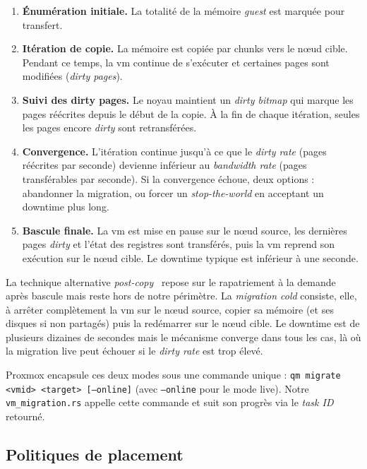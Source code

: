 \begin{enumerate}[leftmargin=*]
    \item \textbf{Énumération initiale.} La totalité de la mémoire \emph{guest} est marquée pour transfert.
    \item \textbf{Itération de copie.} La mémoire est copiée par chunks vers le nœud cible. Pendant ce temps, la \acrshort{vm} continue de s'exécuter et certaines pages sont modifiées (\emph{dirty pages}).
    \item \textbf{Suivi des dirty pages.} Le noyau maintient un \emph{dirty bitmap} qui marque les pages réécrites depuis le début de la copie. À la fin de chaque itération, seules les pages encore \emph{dirty} sont retransférées.
    \item \textbf{Convergence.} L'itération continue jusqu'à ce que le \emph{dirty rate} (pages réécrites par seconde) devienne inférieur au \emph{bandwidth rate} (pages transférables par seconde). Si la convergence échoue, deux options : abandonner la migration, ou forcer un \emph{stop-the-world} en acceptant un downtime plus long.
    \item \textbf{Bascule finale.} La \acrshort{vm} est mise en pause sur le nœud source, les dernières pages \emph{dirty} et l'état des registres sont transférés, puis la \acrshort{vm} reprend son exécution sur le nœud cible. Le downtime typique est inférieur à une seconde.
\end{enumerate}

La technique alternative \emph{post-copy}~\cite{hines_2009} repose sur le rapatriement à la demande après bascule mais reste hors de notre périmètre. La \emph{migration cold} consiste, elle, à arrêter complètement la \acrshort{vm} sur le nœud source, copier sa mémoire (et ses disques si non partagés) puis la redémarrer sur le nœud cible. Le downtime est de plusieurs dizaines de secondes mais le mécanisme converge dans tous les cas, là où la migration live peut échouer si le \emph{dirty rate} est trop élevé.

Proxmox encapsule ces deux modes sous une commande unique : \texttt{qm migrate <vmid> <target> [--online]} (avec \texttt{--online} pour le mode live). Notre \texttt{vm\_migration.rs} appelle cette commande et suit son progrès via le \emph{task ID} retourné.

\subsection{Politiques de placement}

